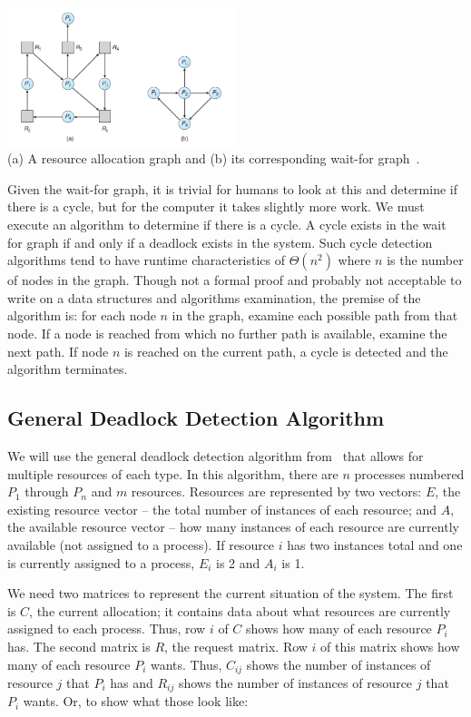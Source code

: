 \documentclass[a4paper]{report}
\begin{document}
\begin{center}
	\includegraphics[width=0.5\textwidth]{images/rag-waitfor.png}\\
	(a) A resource allocation graph and (b) its corresponding wait-for graph~\cite{osc}.
\end{center}

Given the wait-for graph, it is trivial for humans to look at this and determine if there is a cycle, but for the computer it takes slightly more work. We must execute an algorithm to determine if there is a cycle. A cycle exists in the wait for graph if and only if a deadlock exists in the system. Such cycle detection algorithms tend to have runtime characteristics of $\Theta(n^{2})$ where $n$ is the number of nodes in the graph. Though not a formal proof and probably not acceptable to write on a data structures and algorithms examination, the premise of the algorithm is: for each node $n$ in the graph, examine each possible path from that node. If a node is reached from which no further path is available, examine the next path. If node $n$ is reached on the current path, a cycle is detected and the algorithm terminates.

\subsection*{General Deadlock Detection Algorithm}

We will use the general deadlock detection algorithm from~\cite{mos} that allows for multiple resources of each type. In this algorithm, there are $n$ processes numbered $P_{1}$ through $P_{n}$ and $m$ resources. Resources are represented by two vectors: $E$, the existing resource vector -- the total number of instances of each resource; and $A$, the available resource vector -- how many instances of each resource are currently available (not assigned to a process). If resource $i$ has two instances total and one is currently assigned to a process, $E_{i}$ is 2 and $A_{i}$ is 1.

We need two matrices to represent the current situation of the system. The first is $C$, the current allocation; it contains data about what resources are currently assigned to each process. Thus, row $i$ of $C$ shows how many of each resource $P_{i}$ has. The second matrix is $R$, the request matrix. Row $i$ of this matrix shows how many of each resource $P_{i}$ wants. Thus, $C_{ij}$ shows the number of instances of resource $j$ that $P_{i}$ has and $R_{ij}$ shows the number of instances of resource $j$ that $P_{i}$ wants. Or, to show what those look like:
\end{document}
